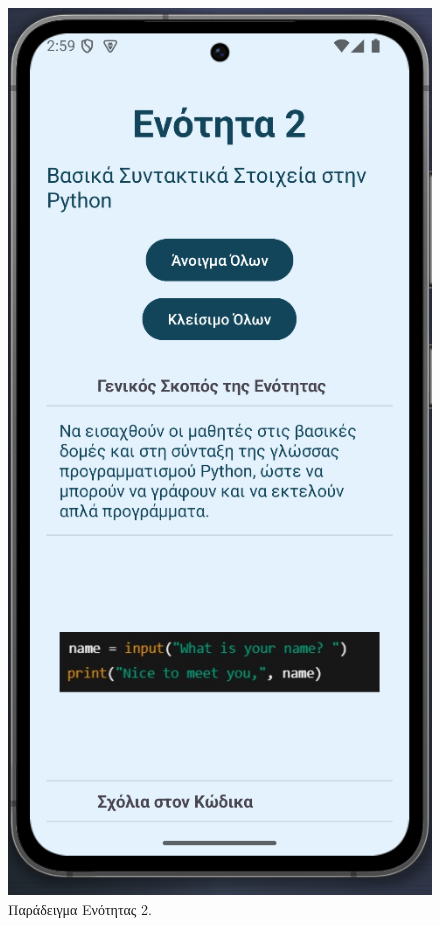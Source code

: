 \documentclass[11pt]{report}
\begin{document}
\begin{figure}[H]
  \centering
  \includegraphics[width=0.9\linewidth, height=0.35\textheight, keepaspectratio]{Figures/s6.png}
  \caption{Παράδειγμα Ενότητας 2.}
\end{figure}
\end{document}
